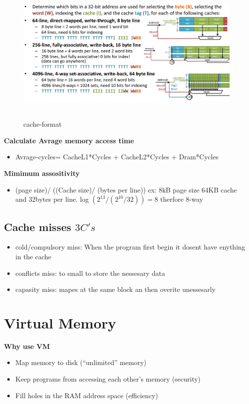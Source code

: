 \begin{figure}[h]
    \vspace{10mm}
    \centering
    \includegraphics[width=16cm, height=7cm]{image/cache-format.png}
    \caption{cache-format}
\end{figure}


\textbf{Calculate Avrage memory access time}
\begin{itemize}
\item  Avrage-cycles= CacheL1*Cycles + CacheL2*Cycles + Dram*Cycles
\end{itemize}

\textbf{Mimimum assositivity}
\begin{itemize}
\item  (page size)/  ((Cache size)/ (bytes per line)) \newline
  ex: 8kB page size 64KB cache and 32bytes per line. log $(2^{13}/ (2^{10}/32)) = 8$  therfore 8-way
\end{itemize}

\subsection{Cache misses $3C's$}
\begin{itemize}
\item  cold/compulsory miss: When the program first begin it dosent have enything in the cache
\item  conflicts miss: to small to store the nessesary data
\item  capasity miss: mapes at the same block an then overite unessesarly 
\end{itemize}


\newpage


\section{Virtual Memory}
\textbf{Why use VM}
\begin{itemize}
\item  Map memory to disk (“unlimited” memory)
\item  Keep programs from accessing each other’s memory (security)
\item  Fill holes in the RAM address space (efficiency)
\end{itemize}

